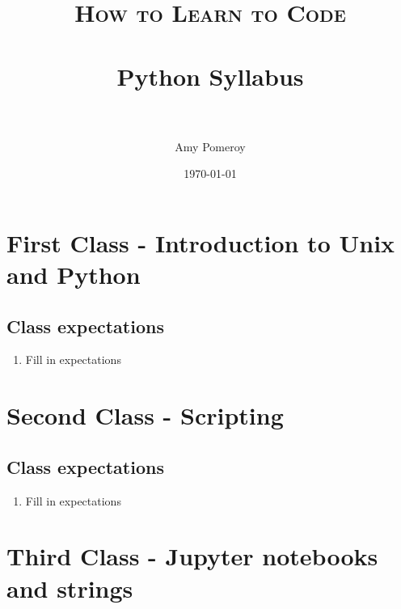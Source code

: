 \documentclass[paper=a4, fontsize=11pt]{scrartcl} %
\title{	
\normalfont \normalsize 
\textsc{How to Learn to Code} \\ [25pt] %
\horrule{0.5pt} \\[0.4cm] %
\huge Python Syllabus \\ %
\horrule{2pt} \\[0.5cm] %
}
\author{Amy Pomeroy} %
\date{\normalsize\today} %
\numberwithin{equation}{section} %
\numberwithin{figure}{section} %
\numberwithin{table}{section} %
\begin{document}
\maketitle %


\section{First Class - Introduction to Unix and Python} 


\subsection{Class expectations}

\begin{enumerate}
\item Fill in expectations 
\end{enumerate}


\section{Second Class - Scripting}


\subsection{Class expectations}

\begin{enumerate}
\item Fill in expectations
\end{enumerate}


\section{Third Class - Jupyter notebooks and strings}
\end{document}
